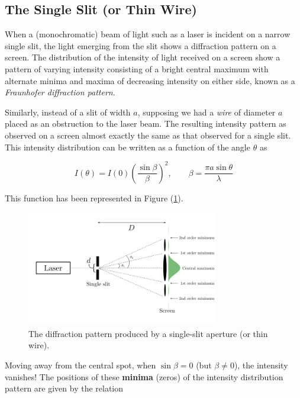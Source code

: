 \subsection*{The Single Slit (or Thin Wire)}

When a (monochromatic) beam of light such as a laser is incident on a narrow single slit, the light emerging from the slit shows a diffraction pattern on a screen. The distribution of the intensity of light received on a screen show a pattern of varying intensity consisting of a bright central maximum with alternate minima and maxima of decreasing intensity on either side, known as a \textit{Fraunhofer diffraction pattern}.

Similarly, instead of a slit of width $a$, supposing we had a \textit{wire} of diameter $a$ placed as an obstruction to the laser beam. The resulting intensity pattern as observed on a screen almost exactly the same as that observed for a single slit. This intensity distribution can be written as a function of the angle $\theta$ as

\begin{equation*}
    I(\theta) = I(0) \left( \frac{\sin \beta}{\beta} \right)^2, \quad \quad  \beta = \frac{\pi a \sin \theta}{\lambda}
\end{equation*}

This function has been represented in Figure (\ref{fig:singleslit}).

\begin{figure}[!htb]
    \centering
    \includegraphics[width=0.75\textwidth]{figs/singleslit.png}
    \caption{The diffraction pattern produced by a single-slit aperture (or thin wire).}
    \label{fig:singleslit}
\end{figure}


Moving away from the central spot, when $\sin\beta=0$ (but $\beta \neq 0$), the intensity vanishes! The positions of these \textbf{minima} (zeros) of the intensity distribution pattern are given by the relation 

